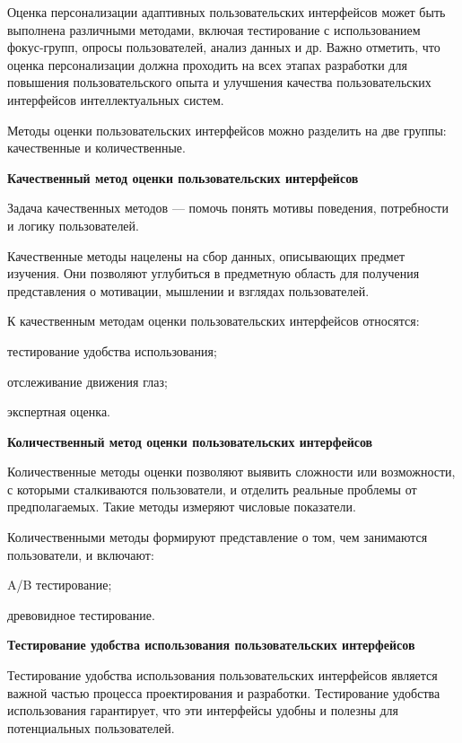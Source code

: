 \begin{textitemize}
	Оценка персонализации адаптивных пользовательских интерфейсов может быть выполнена различными методами, включая тестирование с использованием фокус-групп, опросы пользователей, анализ данных и др.
	Важно отметить, что оценка персонализации должна проходить на всех этапах разработки для повышения пользовательского опыта и улучшения качества пользовательских интерфейсов интеллектуальных систем.
\end{textitemize}


Методы оценки пользовательских интерфейсов можно разделить на две группы: качественные и количественные.

\textbf{Качественный метод оценки пользовательских интерфейсов}
	
Задача качественных методов — помочь понять мотивы поведения, потребности и логику пользователей.
	
Качественные методы нацелены на сбор данных, описывающих предмет изучения. Они позволяют углубиться в предметную область для получения представления о мотивации, мышлении и взглядах пользователей. 
	
К качественным методам оценки пользовательских интерфейсов относятся:
\begin{textitemize}
	\item тестирование удобства использования;
	\item отслеживание движения глаз;
	\item экспертная оценка.
\end{textitemize}	
	
\textbf{Количественный метод оценки пользовательских интерфейсов}

Количественные методы оценки позволяют выявить сложности или возможности, с которыми сталкиваются пользователи, и отделить реальные проблемы от предполагаемых.
Такие методы измеряют числовые показатели. 

Количественными методы формируют представление о том, чем занимаются пользователи, и включают:
\begin{textitemize}
	\item A/B тестирование;
	\item древовидное тестирование.
\end{textitemize}	


\textbf{Тестирование удобства использования пользовательских интерфейсов} 

Тестирование удобства использования пользовательских интерфейсов является важной частью процесса проектирования и разработки. Тестирование удобства использования гарантирует, что эти интерфейсы удобны и полезны для потенциальных пользователей.

